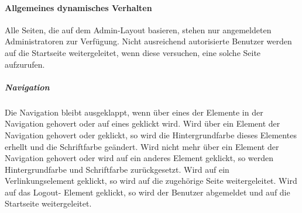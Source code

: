 \paragraph*{Allgemeines dynamisches Verhalten}
Alle Seiten, die auf dem Admin-Layout basieren, stehen nur angemeldeten Administratoren zur Verfügung. 
Nicht ausreichend autorisierte Benutzer werden auf die Startseite weitergeleitet, wenn diese versuchen, eine solche Seite aufzurufen.

\subparagraph*{Navigation}
Die Navigation bleibt ausgeklappt, wenn über eines der Elemente in der Navigation gehovert oder auf eines geklickt wird.
Wird über ein Element der Navigation gehovert oder geklickt, so wird die Hintergrundfarbe dieses Elementes erhellt und die Schriftfarbe geändert.
Wird nicht mehr über ein Element der Navigation gehovert oder wird auf ein anderes Element geklickt, so werden Hintergrundfarbe und Schriftfarbe zurückgesetzt.
Wird auf ein Verlinkungselement geklickt, so wird auf die zugehörige Seite weitergeleitet.
Wird auf das \dq Logout\dq - Element geklickt, so wird der Benutzer abgemeldet und auf die Startseite weitergeleitet.